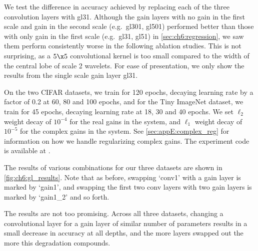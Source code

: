 We test the difference in accuracy achieved by replacing each of the three
convolution layers with gl31.
Although the gain layers with no gain in the first scale and gain in the second
scale (e.g.\ gl301, gl501) performed better than those with only gain in the first scale 
(e.g.\ gl31, gl51) in \autoref{sec:ch6:regression}, we saw them perform consistently worse in the
following ablation studies. This is not surprising, as a $5\x 5$ convolutional
kernel is too small compared to the width of the central lobe of scale 2
wavelets. For ease of presentation, we only show the results from the single
scale gain layer gl31.

On the two CIFAR datasets, we train for 120 epochs, decaying learning rate by a
factor of 0.2 at 60, 80 and 100 epochs, and for the Tiny ImageNet dataset, we
train for 45 epochs, decaying learning rate at 18, 30 and 40 epochs. We set
$\ell_2$ weight decay of $10^{-4}$ for the real gains in the system,
and $\ell_1$ weight decay of $10^{-5}$ for the complex gains in the system.
See
\autoref{sec:appE:complex_reg} for information on how we handle regularizing complex
gains. The experiment code is available at \cite{cotter_dtcwt_2018}.

The results of various combinations for our three datasets are shown in
\autoref{fig:ch6:gl_results}.
Note that as before, swapping `conv1' with a gain layer is marked by `gain1',
and swapping the first two conv layers with two gain layers is marked by
`gain1\_2' and so forth.

The results are not too promising. Across all three datasets, changing a
convolutional layer for a gain layer of similar number of parameters
results in a small decrease in accuracy at all depths, and the more layers
swapped out the more this degradation compounds.

\begin{figure}
  \centering
  \\
  \\
  \label{fig:ch6:gl_results}
\end{figure}

